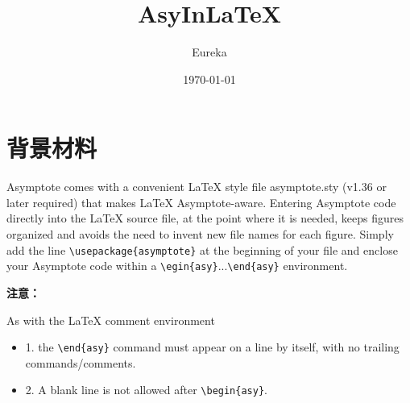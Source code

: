\documentclass[fontset=windows, 12pt]{article}
\title{AsyIn\LaTeX}
\author{Eureka}
\date{\today}
\begin{document}
\maketitle
\thispagestyle{empty}
\section{背景材料}
\begin{tcolorbox}[colback=blue!5!white,colframe=blue!75!black,title=BackInfo]
    Asymptote comes with a convenient LaTeX style file asymptote.sty (v1.36 or later required)
    that makes LaTeX Asymptote-aware.
    Entering Asymptote code directly into the LaTeX
    source file, at the point where it is needed, keeps figures organized and avoids the need to
    invent new file names for each figure. Simply add the line \verb |\usepackage{asymptote}| at the
    beginning of your file and enclose your Asymptote code within a \verb |\egin{asy}|...\verb |\end{asy}|
    environment.

    \textbf{注意：}\par
    As with the LaTeX comment environment
    \begin{itemize}
        \item 1. the \verb |\end{asy}| command must
        appear on a line by itself, with no trailing commands/comments.
        \item 2. A blank line is not
        allowed after \verb |\begin{asy}|.
    \end{itemize}
\end{tcolorbox}
    
\end{document}
